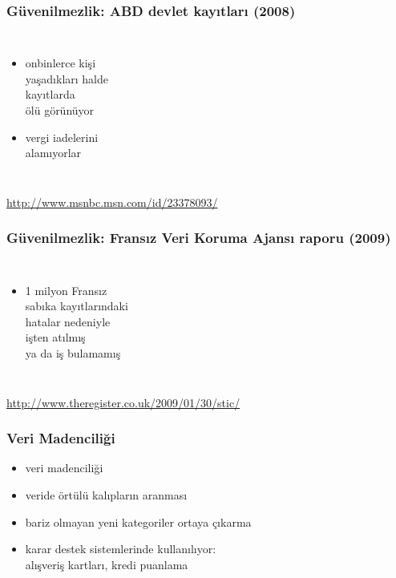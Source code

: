 \documentclass[dvipsnames]{beamer}
\theoremstyle{plain}
\begin{document}
\begin{frame}
  \frametitle{Güvenilmezlik: ABD devlet kayıtları (2008)}

  \begin{columns}

    \begin{itemize}
      \item onbinlerce kişi\\
        yaşadıkları halde\\
        kayıtlarda\\
        ölü görünüyor
      \item vergi iadelerini\\
        alamıyorlar
    \end{itemize}
  \end{columns}

  \medskip
  \tiny{\url{http://www.msnbc.msn.com/id/23378093/}}
\end{frame}

\begin{frame}
  \frametitle{Güvenilmezlik: Fransız Veri Koruma Ajansı raporu (2009)}

  \begin{columns}

    \begin{itemize}
      \item 1 milyon Fransız\\
        sabıka kayıtlarındaki\\
        hatalar nedeniyle\\
        işten atılmış\\
        ya da iş bulamamış
    \end{itemize}
  \end{columns}

  \medskip
  \tiny{\url{http://www.theregister.co.uk/2009/01/30/stic/}}
\end{frame}

\begin{frame}
  \frametitle{Veri Madenciliği}

  \begin{itemize}
    \item \alert{veri madenciliği}
    \item veride örtülü kalıpların aranması
    \item bariz olmayan yeni kategoriler ortaya çıkarma

    \medskip
    \item karar destek sistemlerinde kullanılıyor:\\
      alışveriş kartları, kredi puanlama
  \end{itemize}
\end{frame}
\end{document}
